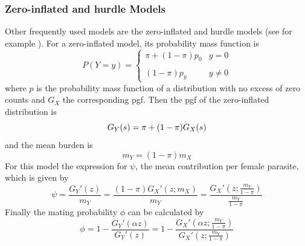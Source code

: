 \documentclass[12pt,a4paper]{article}
\theoremstyle{plain}%
\theoremstyle{definition}
\theoremstyle{remark}
\begin{document}
	\subsubsection{Zero-inflated and hurdle Models}
	Other frequently used models  are the zero-inflated and hurdle models (see for example  \citep{abdybekova2012frequency,crofton1971quantitative,denwood2008distribution,ziadinov2010frequency}).
	For a zero-inflated model, its probability mass function is 
	\begin{equation*}\label{zid}
	P(Y=y)= \left\{ \begin{array}{lc}
	\pi + (1-\pi)p_0 & y=0 \\
	\\ (1-\pi)p_y  & y\neq 0
	\end{array}
	\right.
	\end{equation*}
	where $p$ is the probability mass function of a distribution with no excess of zero counts and $G_X$ the corresponding pgf. 
	Then the pgf of the zero-inflated distribution is
	\begin{equation*}
	G_Y(s)=\pi+(1-\pi)G_X(s)\\
	\end{equation*}
	and the mean burden is  %
		\begin{equation*}
	m_Y=(1-\pi)m_X
	\end{equation*}
	For this model the 
	expression for $\psi$, the mean contribution per female parasite, which is given by
	\begin{equation}\label{zipsi}
	\psi= \frac{G_Y'(z)}{m_Y}=  \frac{(1-\pi)G_X'(z;m_X)}{m_Y}=\frac{G_X'\left( z;\frac{m_Y}{1-\pi}\right) }{\frac{m_Y}{1-\pi}} 
	\end{equation}
	Finally the mating probability $\phi$ can be calculated by     
	\begin{equation}\label{ziphi}
	\phi=1-\frac{G_Y'(\alpha z)}{G_Y'(z)}=1-\frac{G_X'\left(\alpha z;\frac{m_Y}{1-\pi}\right)}{G_X'\left( z;\frac{m_Y}{1-\pi}\right)} 
	\end{equation}
	
\end{document}
